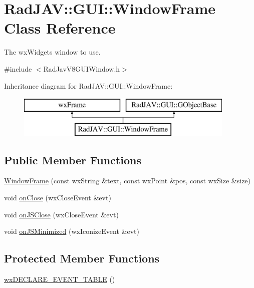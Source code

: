 \hypertarget{class_rad_j_a_v_1_1_g_u_i_1_1_window_frame}{}\section{Rad\+J\+AV\+:\+:G\+UI\+:\+:Window\+Frame Class Reference}
\label{class_rad_j_a_v_1_1_g_u_i_1_1_window_frame}


The wx\+Widgets window to use.  




{\ttfamily \#include $<$Rad\+Jav\+V8\+G\+U\+I\+Window.\+h$>$}

Inheritance diagram for Rad\+J\+AV\+:\+:G\+UI\+:\+:Window\+Frame\+:\begin{figure}[H]
\begin{center}
\leavevmode
\includegraphics[height=2.000000cm]{class_rad_j_a_v_1_1_g_u_i_1_1_window_frame}
\end{center}
\end{figure}
\subsection*{Public Member Functions}
\begin{DoxyCompactItemize}
\item 
\mbox{\hyperlink{class_rad_j_a_v_1_1_g_u_i_1_1_window_frame_a72f62c3d53cd2e7cdced3abd8e04d9f1}{Window\+Frame}} (const wx\+String \&text, const wx\+Point \&pos, const wx\+Size \&size)
\item 
void \mbox{\hyperlink{class_rad_j_a_v_1_1_g_u_i_1_1_window_frame_a40bb6ff126e0a656ff4fdf4e00755479}{on\+Close}} (wx\+Close\+Event \&evt)
\item 
void \mbox{\hyperlink{class_rad_j_a_v_1_1_g_u_i_1_1_window_frame_ad953e36602de7758f3095e630e07e9d7}{on\+J\+S\+Close}} (wx\+Close\+Event \&evt)
\item 
void \mbox{\hyperlink{class_rad_j_a_v_1_1_g_u_i_1_1_window_frame_ab78bb2b99436e856c2e256f906d1b569}{on\+J\+S\+Minimized}} (wx\+Iconize\+Event \&evt)
\end{DoxyCompactItemize}
\subsection*{Protected Member Functions}
\begin{DoxyCompactItemize}
\item 
\mbox{\hyperlink{class_rad_j_a_v_1_1_g_u_i_1_1_window_frame_a5870b60612219d17f1b733fa2013261e}{wx\+D\+E\+C\+L\+A\+R\+E\+\_\+\+E\+V\+E\+N\+T\+\_\+\+T\+A\+B\+LE}} ()
\end{DoxyCompactItemize}
